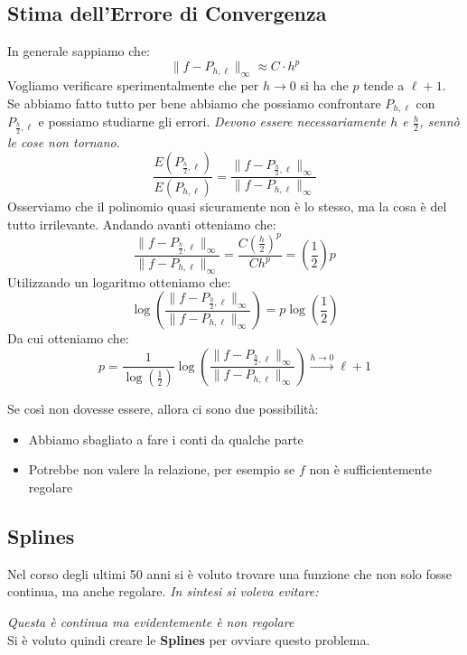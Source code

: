 \documentclass[11pt,a4paper,twoside]{article}
\theoremstyle{definition}
\begin{document}
\subsection{Stima dell'Errore di Convergenza}

In generale sappiamo che:
\[ \|f - P_{h,\ell}\|_\infty \approx C \cdot h^p \]
Vogliamo verificare sperimentalmente che per $h \to 0$ si ha che $p$ tende a $\ell + 1$. Se abbiamo fatto tutto per bene abbiamo che possiamo confrontare $P_{h,\ell}$ con $P_{\frac h2,\ell}$ e possiamo studiarne gli errori. \textit{Devono essere necessariamente $h$ e $\frac h2$, sennò le cose non tornano}.
\[ \frac{E(P_{\frac h2, \ell})}{E(P_{h, \ell})} = \frac{\|f - P_{\frac h2, \ell}\|_\infty}{\|f - P_{h, \ell}\|_\infty}\]
Osserviamo che il polinomio quasi sicuramente non è lo stesso, ma la cosa è del tutto irrilevante. Andando avanti otteniamo che:
\[ \frac{\|f - P_{\frac h2, \ell}\|_\infty}{\|f - P_{h, \ell}\|_\infty} = \frac{C (\frac h2)^p}{Ch^p} = \left( \frac 12 \right)p\]
Utilizzando un logaritmo otteniamo che:
\[ \log\left(\frac{\|f - P_{\frac h2, \ell}\|_\infty}{\|f - P_{h, \ell}\|_\infty}\right) = p \log\left(\frac 12\right)\]
Da cui otteniamo che:
\[ p = \frac 1{\log(\frac 12)} \log\left(\frac{\|f - P_{\frac h2, \ell}\|_\infty}{\|f - P_{h, \ell}\|_\infty}\right) \xrightarrow{h \to 0} \ell + 1\]

Se così non dovesse essere, allora ci sono due possibilità:
\begin{itemize}
	\item Abbiamo sbagliato a fare i conti da qualche parte
	\item Potrebbe non valere la relazione, per esempio se $f$ non è sufficientemente regolare
\end{itemize}

\subsection{Splines}
Nel corso degli ultimi 50 anni si è voluto trovare una funzione che non solo fosse continua, ma anche regolare. \textit{In sintesi si voleva evitare:}
\begin{center}
\end{center}
\textit{Questa è continua ma evidentemente è non regolare}\\
Si è voluto quindi creare le \textbf{Splines} per ovviare questo problema.
\end{document}
